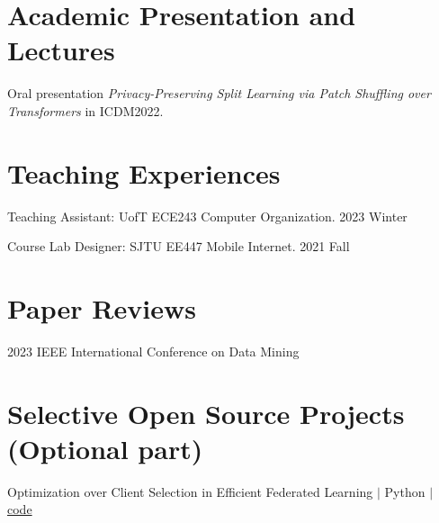 \documentclass[letterpaper,12pt]{article}
\begin{document}
\vspace{-5pt}
{\color{DarkBlue}\section {Academic Presentation and Lectures}}  
 \begin{itemize}[leftmargin=0.15in]
 \small{\item Oral presentation \emph{Privacy-Preserving Split Learning via Patch Shuffling over Transformers} in ICDM2022.}\vspace{-5pt}
 \end{itemize}

\vspace{-5pt}
{\color{DarkBlue}\section {Teaching Experiences}}  
\begin{itemize}[leftmargin=0.15in]
\small{\item Teaching Assistant: UofT ECE243 Computer Organization. 2023 Winter}\vspace{-5pt}
\small{\item Course Lab Designer: SJTU EE447 Mobile Internet. 2021 Fall}\vspace{-5pt}
\end{itemize}
 
\vspace{-5pt}
{\color{DarkBlue}\section {Paper Reviews}}  
 \begin{itemize}[leftmargin=0.15in]
 \small{\item 2023 IEEE International Conference on Data Mining}\vspace{-5pt}
 \end{itemize}

 \vspace{-5pt}
\section{\color{DarkBlue}Selective Open Source Projects (Optional part)}
\begin{itemize}[leftmargin=0.15in]
	\small{\item Optimization over Client Selection in Efficient Federated Learning $|$ Python $|$  \href{https://github.com/dixiyao/ece1505-course-project}{{\color{refBlue}code}}}\vspace{-5pt}
\end{itemize}  
    
\end{document}
